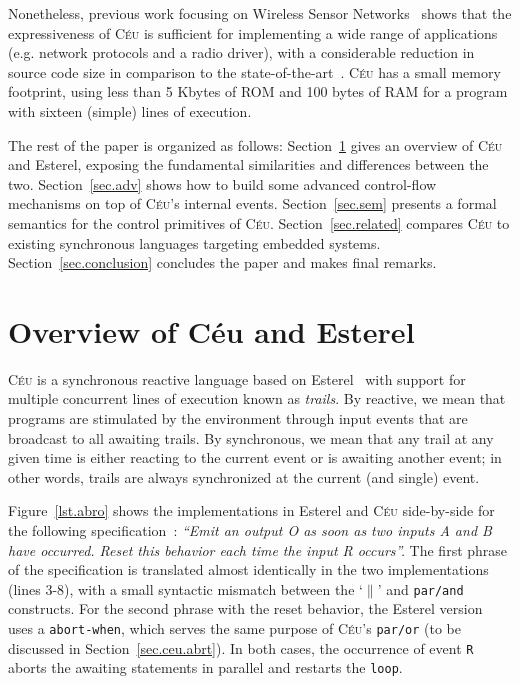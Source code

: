 \documentclass{acm_proc_article-sp}
\newcommand{\CEU}{\textsc{C\'{e}u}\xspace}
\newcommand{\code}[1] {{\small{\texttt{#1}}}}
\newcommand{\1}{\;}
\newcommand{\2}{\;\;}
\newcommand{\3}{\;\;\;}
\newcommand{\5}{\;\;\;\;\;}
\begin{document}
Nonetheless, previous work focusing on Wireless Sensor 
Networks~\cite{ceu.sensys} shows that the expressiveness of \CEU is sufficient 
for implementing a wide range of applications (e.g. network protocols and a 
radio driver), with a considerable reduction in source code size in comparison 
to the state-of-the-art~\cite{wsn.nesc}.
%
\CEU has a small memory footprint, using less than 5 Kbytes of ROM and 100 
bytes of RAM for a program with sixteen (simple) lines of execution.

The rest of the paper is organized as follows:
Section~\ref{sec.ceu} gives an overview of \CEU and Esterel, exposing the 
fundamental similarities and differences between the two.
Section~\ref{sec.adv} shows how to build some advanced control-flow mechanisms 
on top of \CEU's internal events.
Section~\ref{sec.sem} presents a formal semantics for the control primitives of 
\CEU.
Section~\ref{sec.related} compares \CEU to existing synchronous languages 
targeting embedded systems.
Section~\ref{sec.conclusion} concludes the paper and makes final remarks.

\newpage
\section{Overview of C\'eu and Esterel}
\label{sec.ceu}

\CEU is a synchronous reactive language based on Esterel~\cite{esterel.ieee91} 
with support for multiple concurrent lines of execution known as \emph{trails}.
By reactive, we mean that programs are stimulated by the environment through 
input events that are broadcast to all awaiting trails.
By synchronous, we mean that any trail at any given time is either reacting to 
the current event or is awaiting another event;
in other words, trails are always synchronized at the current (and single) 
event.

Figure~\ref{lst.abro} shows the implementations in Esterel and \CEU 
side-by-side for the following specification~\cite{esterel.primer}:
%
\emph{``Emit an output O as soon as two inputs A and B have occurred.
Reset this behavior each time the input R occurs''.}
%
The first phrase of the specification is translated almost identically in the 
two implementations (lines 3-8), with a small syntactic mismatch between the 
`$\|$' and \code{par/and} constructs.
%
For the second phrase with the reset behavior, the Esterel version uses a 
\code{abort-when}, which serves the same purpose of \CEU's \code{par/or} (to be 
discussed in Section~\ref{sec.ceu.abrt}).
In both cases, the occurrence of event \code{R} aborts the awaiting statements 
in parallel and restarts the \code{loop}.
\end{document}
